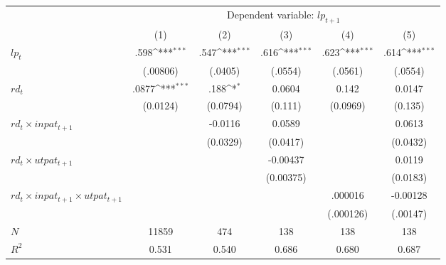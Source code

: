 {
\def\sym#1{\ifmmode^{#1}\else\(^{#1}\)\fi}
\begin{tabular}{l*{5}{c}}
\hline\hline
            &\multicolumn{5}{c}{Dependent variable: $lp_{t+1}$}\\\cmidrule{2-6}
            &\multicolumn{1}{c}{(1)}&\multicolumn{1}{c}{(2)}&\multicolumn{1}{c}{(3)}&\multicolumn{1}{c}{(4)}&\multicolumn{1}{c}{(5)}\\
\hline
 $lp_{t}$        &       .598\sym{***}&       .547\sym{***}&       .616\sym{***}&       .623\sym{***}&       .614\sym{***}\\
            &   (.00806)         &    (.0405)         &    (.0554)         &    (.0561)         &    (.0554)         \\
$rd_{t}$      &      .0877\sym{***}&       .188\sym{*}  &      0.0604         &       0.142         &      0.0147         \\
            &    (0.0124)         &    (0.0794)         &     (0.111)         &    (0.0969)         &     (0.135)         \\
$rd_{t}\times inpat_{t+1}$    &                     &     -0.0116         &      0.0589         &                     &      0.0613         \\
            &                     &    (0.0329)         &    (0.0417)         &                     &    (0.0432)         \\
$rd_{t}\times utpat_{t+1}$    &                     &                     &    -0.00437         &                     &      0.0119         \\
            &                     &                     &   (0.00375)         &                     &    (0.0183)         \\
$rd_{t}\times inpat_{t+1} \times utpat_{t+1} $  &                     &                     &                     &   .000016        &    -0.00128         \\
            &                     &                     &                     &  (.000126)         &   (.00147)         \\
\hline
\(N\)       &       11859         &         474         &         138         &         138         &         138         \\
\(R^{2}\)   &       0.531         &       0.540         &       0.686         &       0.680         &       0.687         \\
\hline\hline
\end{tabular}
}
